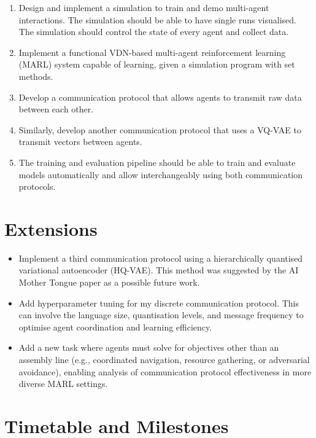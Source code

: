 \documentclass[20pt]{article}
\begin{document}
\begin{enumerate}
\item Design and implement a simulation to train and demo multi-agent interactions. The simulation should be able to have single runs visualised. The simulation should control the state of every agent and collect data.
\item Implement a functional VDN-based multi-agent reinforcement learning (MARL) system capable of learning, given a simulation program with set methods.
\item Develop a communication protocol that allows agents to transmit raw data between each other.
\item Similarly, develop another communication protocol that uses a VQ-VAE  to transmit vectors between agents.
\item The training and evaluation pipeline should be able to train and evaluate models automatically and allow interchangeably using both communication protocols.
\end{enumerate}


\section{Extensions}

\begin{itemize}
\item Implement a third communication protocol using a hierarchically quantised variational autoencoder (HQ-VAE). This method was suggested by the AI Mother Tongue paper as a possible future work.
\item Add hyperparameter tuning for my discrete communication protocol. This can involve the language size, quantisation levels, and message frequency to optimise agent coordination and learning efficiency.
\item Add a new task where agents must solve for objectives other than an assembly line (e.g., coordinated navigation, resource gathering, or adversarial avoidance), enabling analysis of communication protocol effectiveness in more diverse MARL settings.
\end{itemize}

\pagebreak

\section{Timetable and Milestones}
\end{document}
